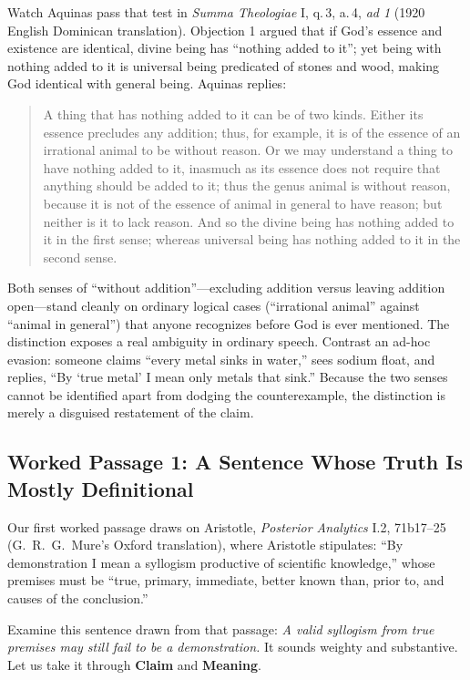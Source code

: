 Watch Aquinas pass that test in \emph{Summa Theologiae} I, q.\,3, a.\,4, \emph{ad 1} (1920 English Dominican translation). Objection 1 argued that if God's essence and existence are identical, divine being has ``nothing added to it''; yet being with nothing added to it is universal being predicated of stones and wood, making God identical with general being. Aquinas replies:

\begin{quote}
A thing that has nothing added to it can be of two kinds. Either its essence precludes any addition; thus, for example, it is of the essence of an irrational animal to be without reason. Or we may understand a thing to have nothing added to it, inasmuch as its essence does not require that anything should be added to it; thus the genus animal is without reason, because it is not of the essence of animal in general to have reason; but neither is it to lack reason. And so the divine being has nothing added to it in the first sense; whereas universal being has nothing added to it in the second sense.
\end{quote}

Both senses of ``without addition''---excluding addition versus leaving addition open---stand cleanly on ordinary logical cases (``irrational animal'' against ``animal in general'') that anyone recognizes before God is ever mentioned. The distinction exposes a real ambiguity in ordinary speech. Contrast an ad-hoc evasion: someone claims ``every metal sinks in water,'' sees sodium float, and replies, ``By `true metal' I mean only metals that sink.'' Because the two senses cannot be identified apart from dodging the counterexample, the distinction is merely a disguised restatement of the claim.

\subsection{Worked Passage 1: A Sentence Whose Truth Is Mostly Definitional}

Our first worked passage draws on Aristotle, \emph{Posterior Analytics} I.2, 71b17--25 (G.\ R.\ G.\ Mure's Oxford translation), where Aristotle stipulates: ``By demonstration I mean a syllogism productive of scientific knowledge,'' whose premises must be ``true, primary, immediate, better known than, prior to, and causes of the conclusion.''

Examine this sentence drawn from that passage: \emph{A valid syllogism from true premises may still fail to be a demonstration.} It sounds weighty and substantive. Let us take it through \textbf{Claim} and \textbf{Meaning}.

